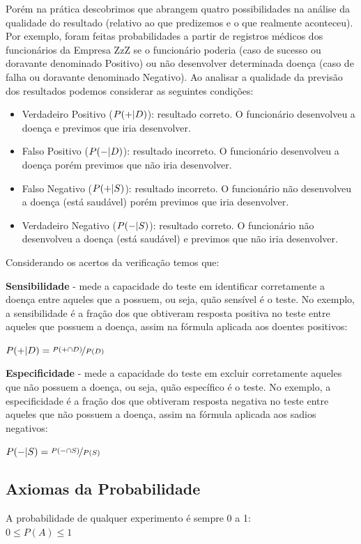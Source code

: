 \documentclass[a4paper,11pt]{article}
\begin{document}
Porém na prática descobrimos que abrangem quatro possibilidades na análise da qualidade do resultado (relativo ao que predizemos e o que realmente aconteceu). Por exemplo, foram feitas probabilidades a partir de registros médicos dos funcionários da Empresa ZzZ se o funcionário poderia (caso de sucesso ou doravante denominado Positivo) ou não desenvolver determinada doença (caso de falha ou doravante denominado Negativo). Ao analisar a qualidade da previsão dos resultados podemos considerar as seguintes condições: \vspace{-1em}
\begin{itemize}
	\item Verdadeiro Positivo ($P(+ \arrowvert D)$): resultado correto. O funcionário desenvolveu a doença e previmos que iria desenvolver.
	\item Falso Positivo ($P(- \arrowvert D)$): resultado incorreto. O funcionário desenvolveu a doença porém previmos que não iria desenvolver.
	\item Falso Negativo ($P(+ \arrowvert S)$): resultado incorreto. O funcionário não desenvolveu a doença (está saudável) porém previmos que iria desenvolver.
	\item Verdadeiro Negativo ($P(- \arrowvert S)$): resultado correto. O funcionário não desenvolveu a doença (está saudável) e previmos que não iria desenvolver.
\end{itemize}

Considerando os acertos da verificação temos que:

\textbf{Sensibilidade} - mede a capacidade do teste em identificar corretamente a doença entre aqueles que a possuem, ou seja, quão sensível é o teste. No exemplo, a sensibilidade é a fração dos que obtiveram resposta positiva no teste entre aqueles que possuem a doença, assim na fórmula aplicada aos doentes positivos:

$P(+ \arrowvert D) = \nicefrac{P( + \cap D)}{P(D)}$

\textbf{Especificidade} - mede a capacidade do teste em excluir corretamente aqueles que não possuem a doença, ou seja, quão específico é o teste. No exemplo, a especificidade é a fração dos que obtiveram resposta negativa no teste entre aqueles que não possuem a doença, assim na fórmula aplicada aos sadios negativos:

$P(- \arrowvert S) = \nicefrac{P( - \cap S)}{P(S)}$

\subsection{Axiomas da Probabilidade}
A probabilidade de qualquer experimento é sempre 0 a 1: \\
$0 \leq P(A) \leq 1$
\end{document}
